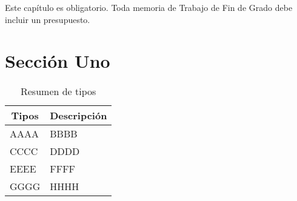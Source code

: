 Este capítulo es obligatorio. Toda memoria de Trabajo de Fin de Grado debe incluir un presupuesto.

\section{Sección Uno}

\begin{table}[t]
  \begin{center}
  \begin{tabular}{ | l | l | }
  \hline
  \multicolumn{1}{|c|}{\bf Tipos} & \multicolumn{1}{|c|}{\bf Descripción} \\
  \hline
  AAAA  & BBBB \\
  \hline
  CCCC  & DDDD \\
  \hline
  EEEE  & FFFF \\
  \hline
  GGGG  & HHHH \\
  \hline
 \end{tabular}
 \end{center}
 \caption{Resumen de tipos}
 \label{tab:presupuesto}
\end{table}